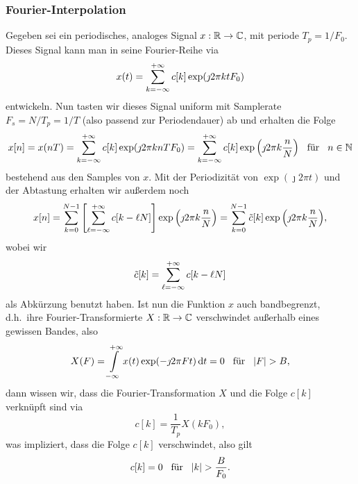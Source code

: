 \subsubsection{Fourier-Interpolation}
%
%
Gegeben sei ein periodisches, analoges Signal $x: \mathbb{R} \rightarrow \mathbb{C}$, mit periode $T_p = 1/F_0$. Dieses Signal kann man in seine Fourier-Reihe via
\begin{equation}\label{fourier_series}
    x(t) = {\sum\limits_{k=-\infty}^{+\infty}{
        c[k] \exp(\jmath 2 \pi k t F_0) 
    }}
\end{equation}
entwickeln. Nun tasten wir dieses Signal uniform mit Samplerate $F_s = N/T_p = 1/T$ (also passend zur Periodendauer) ab und erhalten die Folge 
\begin{equation}
    x[n] = x(n T) = {\sum\limits_{k=-\infty}^{+\infty}{
        c[k] \exp(\jmath 2 \pi k n T F_0) 
    }} = {\sum\limits_{k=-\infty}^{+\infty}{
        c[k] \exp\left(\jmath 2 \pi k \frac nN\right) 
    }}
    {\hspace{3mm} \text{f\"ur} \hspace{3mm}}
    n \in \mathbb{N}
\end{equation}
bestehend aus den Samples von $x$. Mit der Periodizit\"at von $\exp(\jmath 2 \pi t)$ und der Abtastung erhalten wir au{\ss}erdem noch
\begin{equation}
    x[n] = {\sum\limits_{k=0}^{N-1}{
        \left[{\sum\limits_{\ell=-\infty}^{+\infty}{
            c[k - \ell N]
        }}\right] \exp\left(\jmath 2 \pi k \frac nN\right) 
    }} = {\sum\limits_{k=0}^{N-1}{
        \tilde{c}[k] \exp\left(\jmath 2 \pi k \frac nN\right) 
    }},
\end{equation}
wobei wir 
\begin{equation}\label{aliased_ck}
    \tilde{c}[k] = {\sum\limits_{\ell=-\infty}^{+\infty}{
        c[k - \ell N]
    }}
\end{equation}
als Abk\"urzung benutzt haben. Ist nun die Funktion $x$ auch bandbegrenzt, d.h.~ihre Fourier-Transformierte $X : \mathbb{R} \rightarrow \mathbb{C}$ verschwindet au{\ss}erhalb eines gewissen Bandes, also
\begin{equation}
    X(F) = {\int\limits_{-\infty}^{+\infty}{x(t) \exp(-\jmath 2 \pi F t )}\,\mathrm{d}{t}} = 0 {\hspace{3mm} \text{f\"ur} \hspace{3mm}} {\left| F \right|} > B,
\end{equation}
dann wissen wir, dass die Fourier-Transformation $X$ und die Folge $c[k]$ verkn\"upft sind via 
\begin{equation}
    c[k] = \frac{1}{T_p} X(k F_0),
\end{equation}
was impliziert, dass die Folge $c[k]$ verschwindet, also gilt
\begin{equation}
    c[k] = 0 {\hspace{3mm} \text{f\"ur} \hspace{3mm}} {\left| k \right|} > \frac{B}{F_0}.
\end{equation}
